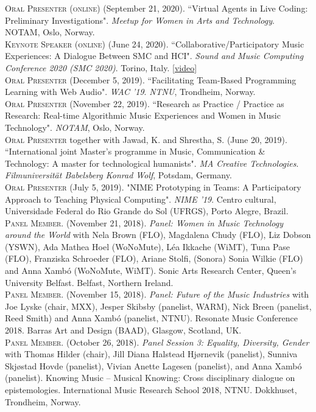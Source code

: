 \documentclass[10pt, a4paper]{article}
\newcommand{\years}[1]{\marginnote{\scriptsize #1}}
\begin{document}
{\years{2020b} \textsc{Oral Presenter (online)} (September 21, 2020). “Virtual Agents in Live Coding: Preliminary Investigations". \emph{Meetup for Women in Arts and Technology}. NOTAM, Oslo, Norway.\\ 
\years{2020a} \textsc{Keynote Speaker (online)} (June 24, 2020). “Collaborative/Participatory Music Experiences: A Dialogue Between SMC and HCI". \emph{Sound and Music Computing Conference 2020 (SMC 2020)}. Torino, Italy. \href{https://youtu.be/fWqhhdkVO6o}{[video]}\\ 
\years{2019d} \textsc{Oral Presenter} (December 5, 2019). “Facilitating Team-Based Programming Learning with Web Audio". \emph{WAC '19}. 
\emph{NTNU}, Trondheim, Norway.\\
\years{2019c} \textsc{Oral Presenter} (November 22, 2019). “Research as Practice / Practice as Research: Real-time Algorithmic Music Experiences and Women in Music Technology". \emph{NOTAM}, Oslo, Norway.\\
\years{2019b} \textsc{Oral Presenter} together with Jawad, K. and Shrestha, S. (June 20, 2019). “International joint Master's programme in Music, Communication \& Technology: A master for technological humanists". \emph{MA Creative Technologies}. \emph{Filmuniversität  Babelsberg Konrad Wolf}, Potsdam, Germany.\\
\years{2019a} \textsc{Oral Presenter} (July 5, 2019). "NIME Prototyping in Teams: A Participatory Approach to Teaching Physical Computing". \emph{NIME '19}. Centro cultural, Universidade Federal do Rio Grande do Sol (UFRGS), Porto Alegre, Brazil.\\
\years{2018j}\textsc{Panel Member}. (November 21, 2018). \emph{Panel: Women in Music Technology around the World} with Nela Brown (FLO), Magdalena Chudy (FLO), Liz Dobson (YSWN), Ada Mathea Hoel (WoNoMute), Léa Ikkache (WiMT), Tuna Pase (FLO), Franziska Schroeder (FLO), Ariane Stolfi, (Sonora) Sonia Wilkie (FLO) and Anna Xambó (WoNoMute, WiMT). Sonic Arts Research Center, Queen's University Belfast. Belfast, Northern Ireland.\\
\years{2018i}\textsc{Panel Member}. (November 15, 2018). \emph{Panel: Future of the Music Industries} with Joe Lyske (chair, MXX), Jesper Skibsby (panelist, WARM), Nick Breen (panelist, Reed Smith) and Anna Xambó (panelist, NTNU). Resonate Music Conference 2018. Barras Art and Design (BAAD), Glasgow, Scotland, UK.\\
\years{2018h}\textsc{Panel Member}. (October 26, 2018). \emph{Panel Session 3: Equality, Diversity, Gender} with Thomas Hilder (chair), Jill Diana Halstead Hjørnevik (panelist), Sunniva Skjøstad Hovde (panelist), Vivian Anette Lagesen (panelist), and Anna Xambó (panelist). Knowing Music -- Musical Knowing: Cross disciplinary dialogue on epistemologies. International Music Research School 2018, NTNU. Dokkhuset, Trondheim, Norway.\\
}
\end{document}
